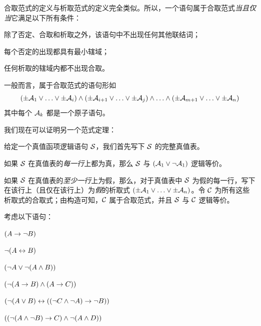 合取范式的定义与析取范式的定义完全类似。所以，一个语句属于合取范式\emph{当且仅当}它满足以下所有条件：


\begin{compactlist}
		\item[(\textsc{cnf1})] 除了否定、合取和析取之外，该语句中不出现任何其他联结词；
		\item[(\textsc{cnf2})] 每个否定的出现都具有最小辖域；
		\item[(\textsc{cnf3})] 任何析取的辖域内都不出现合取。
	\end{compactlist}


一般而言，属于合取范式的语句形如
	$$(\pm \mathcal{A}_1 \lor \ldots \lor \pm \mathcal{A}_i) \land (\pm \mathcal{A}_{i+1} \lor \ldots \lor \pm\mathcal{A}_j) \land \ldots \land (\pm\mathcal{A}_{m+1} \lor\ldots \lor \pm \mathcal{A}_n)$$
其中每个 $\mathcal{A}_k$ 都是一个原子语句。

我们现在可以证明另一个范式定理：


	给定一个真值函项逻辑语句 $\mathcal{S}$，我们首先写下 $\mathcal{S}$ 的完整真值表。

	如果 $\mathcal{S}$ 在真值表的\emph{每一行}上都为真，那么 $\mathcal{S}$ 与 $(\mathcal{A}_1 \vee \neg \mathcal{A}_1)$ 逻辑等价。

	如果 $\mathcal{S}$ 在真值表的\emph{至少一行}上为假，那么，对于真值表中 $\mathcal{S}$ 为假的每一行，写下在该行上（且仅在该行上）为\emph{假}的析取式 $(\pm\mathcal{A}_1 \vee \ldots \vee \pm\mathcal{A}_n)$。令 $\mathcal{C}$ 为所有这些析取式的合取式；由构造可知，$\mathcal{C}$ 属于合取范式，并且 $\mathcal{S}$ 与 $\mathcal{C}$ 逻辑等价。

\practiceproblems
\problempart
\label{pr.DNF}
考虑以下语句：


\begin{compactlist}
		\item $(A \rightarrow \neg B)$
		\item $\neg (A \leftrightarrow B)$
		\item $(\neg A \vee \neg (A \wedge B))$
		\item $(\neg (A \rightarrow B ) \wedge (A \rightarrow C))$
		\item $(\neg (A \vee B) \leftrightarrow ((\neg C \wedge \neg A) \rightarrow \neg B))$
		\item $((\neg (A \wedge \neg B) \rightarrow C) \wedge \neg (A \wedge D))$
	\end{compactlist}



